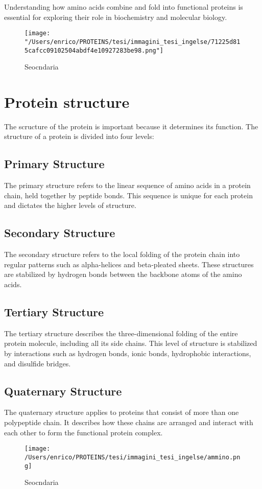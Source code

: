\documentclass[English, Lau, oneside]{sapthesis}
\begin{document}
Understanding how amino acids combine and fold into functional proteins is essential for exploring their role in biochemistry and molecular biology.

\begin{figure}[H]
    \centering
    \texttt{[image: "/Users/enrico/PROTEINS/tesi/immagini\_tesi\_ingelse/71225d815cafcc09102504abdf4e10927283be98.png"]}
    \caption{Seocndaria}
\end{figure}



\section{Protein structure}
The scructure of the protein is important because it determines its function. 
The structure of a protein is divided into four levels:
\subsection{Primary Structure}
The primary structure refers to the linear sequence of amino acids in a protein chain, held together by peptide bonds. This sequence is unique for each protein and dictates the higher levels of structure.

\subsection{Secondary Structure}
The secondary structure refers to the local folding of the protein chain into regular patterns such as alpha-helices and beta-pleated sheets. These structures are stabilized by hydrogen bonds between the backbone atoms of the amino acids.

\subsection{Tertiary Structure}
The tertiary structure describes the three-dimensional folding of the entire protein molecule, including all its side chains. This level of structure is stabilized by interactions such as hydrogen bonds, ionic bonds, hydrophobic interactions, and disulfide bridges.

\subsection{Quaternary Structure}
The quaternary structure applies to proteins that consist of more than one polypeptide chain. It describes how these chains are arranged and interact with each other to form the functional protein complex.
\begin{figure}[H]
    \centering
    \texttt{[image: /Users/enrico/PROTEINS/tesi/immagini\_tesi\_ingelse/ammino.png]}
    \caption{Seocndaria}
\end{figure}
\end{document}
